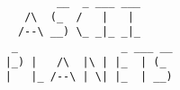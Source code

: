 \lstset{basicstyle=\ttfamily}
\begin{lstlisting}
            __  _ ___ ___
       /\  (_  /   |   |
      /--\ __) \_ _|_ _|_
     _                _ ___ __
    |_) |   /\  |\ | |_  | (_
    |   |_ /--\ | \| |_  | __)
\end{lstlisting}
